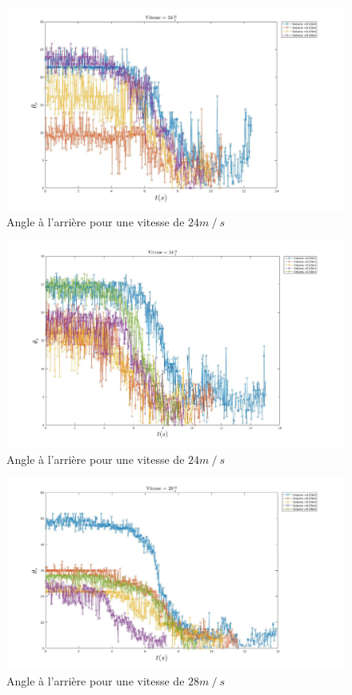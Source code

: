 \documentclass[french]{article}
\begin{document}
\begin{figure}[h]
	\centering
	\includegraphics[width = \linewidth]{./image/v=24or_1.jpg}
	\caption{Angle à l'arrière pour une vitesse de $24m\mathbin{/}s$}
\end{figure}
\begin{figure}[hb]
	\centering
	\includegraphics[width = \linewidth]{./image/v=24or_2.jpg}
	\caption{Angle à l'arrière pour une vitesse de $24m\mathbin{/}s$}
\end{figure}
\begin{figure}[hb]
	\centering
	\includegraphics[width = \linewidth]{./image/v=28or_1.jpg}
	\caption{Angle à l'arrière pour une vitesse de $28m\mathbin{/}s$}
\end{figure}
\end{document}
